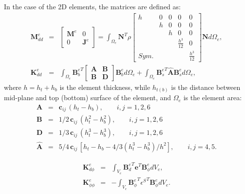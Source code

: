 \documentclass[sensors,article,accept,moreauthors,pdftex]{Definitions/mdpi}
\begin{document}
\begin{paracol}{2}
In the case of the 2D elements, the matrices are defined as:
\begin{eqnarray}
\textbf{M}_{dd}^e & = &
\left [
\begin{array}{cc}
\textbf{M}^e & 0\\
0 & \textbf{J}^e
\end{array}
\right] =
\int_{\Omega_e}\textbf{N}^T\rho 
\left [
\begin{array}{ccccc}
h & 0 & 0 & 0 & 0 \\
  & h & 0 & 0 & 0 \\
 &  & h & 0 & 0\\
 &  &  & \frac{h^3}{12} & 0\\
Sym. &  &  &  & \frac{h^3}{12}
\end{array} \right]
\textbf{N} d\Omega_e,\\
\textbf{K}_{dd}^e & = & \int_{\Omega_e}{\textbf{B}_b^e}^T
\left[
\begin{array}{cc}
\textbf{A} & \textbf{B}\\
\textbf{B} & \textbf{D}
\end{array} \right]
\textbf{B}_b^ed \Omega_e+\int_{\Omega_e}{\textbf{B}_s^e}^T\hat{\textbf{A}}\textbf{B}_s^ed \Omega_e,
\end{eqnarray}
where \(h=h_t+h_b\) is the element thickness, while \(h_{t(b)}\) is the distance between mid-plane and top (bottom) surface of the element, and \(\Omega_e\) is the element area:
\begin{equation}
\begin{array}{ccl}
\textbf{A} & = & \textbf{c}_{ij}\,(h_t-h_b),\qquad i,j=1,2,6\\
\textbf{B} & = & 1/2\, \textbf{c}_{ij}\,(h_t^2-h_b^2),\qquad i,j=1,2,6\\
\textbf{D} & = & 1/3\, \textbf{c}_{ij}\,(h_t^3-h_b^3),\qquad i,j=1,2,6\\
\hat{\textbf{A}} & = & 5/4\, \textbf{c}_{ij}\,\left[h_t-h_b-4/3\left(h_t^3-h_b^3\right)/h^2\right],\qquad i,j=4,5.
\end{array}
\end{equation}

\begin{eqnarray}
\textbf{K}_{d\phi}^e & = & \int_{V_e}{\textbf{B}_d^e}^T\textbf{e}^T \textbf{B}_{\phi}^ed V_e,\\
\textbf{K}_{\phi \phi}^e & = & -\int_{V_e}{\textbf{B}_{\phi}^e}^T 
{\textbf{\(\epsilon\)}^S}^T \textbf{B}_{\phi}^edV_e.
\end{eqnarray}

\end{paracol}
\end{document}
